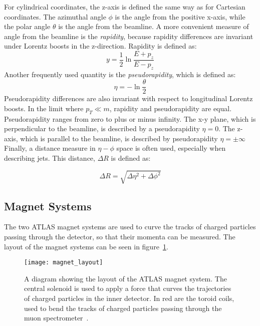 For cylindrical coordinates, the z-axis is defined the same way as for
Cartesian coordinates. The azimuthal angle $\phi$ is the angle
from the positive x-axis, while the polar angle $\theta$ is the angle
from the beamline. A more convenient measure of angle from the beamline is the \textit{rapidity}, because rapidity differences are invariant under Lorentz boosts in the z-direction.
Rapidity is defined as:
\begin{equation}
y = \frac{1}{2}\ln\frac{E+p_z}{E-p_z}
\end{equation}
Another frequently used quantity is the
\textit{pseudorapidity}, which is defined as:
\begin{equation}
\eta = -\ln\frac{\theta}{2}
\end{equation}
Pseudorapidity differences are also invariant with respect to
longitudinal Lorentz boosts. In the limit where $p_T \ll m$, rapidity and
pseudorapidity are equal. Pseudorapidity ranges from zero to plus or minus infinity.
The x-y plane, which is perpendicular to the beamline, is described by a pseudorapidity $\eta=0$.
The z-axis, which is parallel to the beamline, is described by pseudorapidity $\eta=\pm\infty$
Finally, a distance measure in $\eta-\phi$ space is often used, especially when describing jets.
This distance, $\Delta R$ is defined as:

\begin{equation}
\Delta R = \sqrt{\Delta\eta^2+\Delta\phi^2}
\end{equation}

\subsection{Magnet Systems}\label{subsec:magnet_systems}
The two ATLAS magnet systems are used to curve the tracks of charged particles passing through the detector,
so that their momenta can be measured. The layout of the magnet systems can be seen in figure~\ref{fig:magnet_layout}.

\begin{figure}[!ht]\centering
\texttt{[image: magnet\_layout]}
\caption{A diagram showing the layout of the ATLAS magnet system.
The central solenoid is used to apply a force that curves the trajectories of charged particles in the inner detector.
In red are the toroid coils, used to bend the tracks of charged particles passing through the muon spectrometer~\cite{atlas-detector-2008}.}
\label{fig:magnet_layout}
\end{figure}

